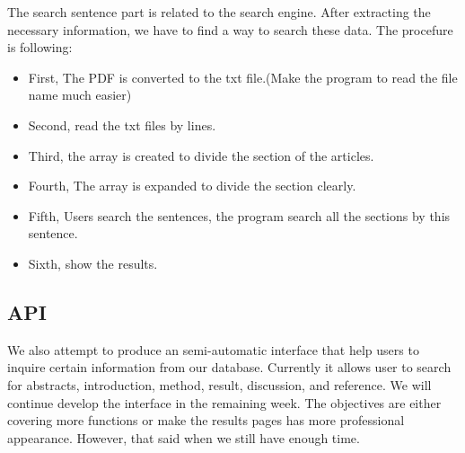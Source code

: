 The search sentence part is related to the search engine.
After extracting the necessary information, we have to find a way to search these data.
The procefure is following:
\begin{itemize}
	
	\item First, The PDF is converted to the txt file.(Make the program to read the file name much easier)
	\item Second, read the txt files by lines.
	\item Third, the array is created to divide the section of the articles.
	\item Fourth, The array is expanded to divide the section clearly.
	\item Fifth, Users search the sentences, the program search all the sections by this sentence.
	\item Sixth, show the results.
	
\end{itemize}
\subsection{API}
We also attempt to produce an semi-automatic interface that help users to inquire certain information from our database. 
Currently it allows user to search for abstracts, introduction, method, result, discussion, and reference. We will continue develop the interface in the remaining week. 
The objectives are either covering more functions or make the results pages has more professional appearance. However, that
said when we still have enough time.

\newpage %